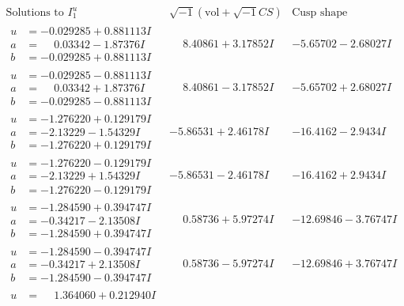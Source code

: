 \documentclass[1p]{elsarticle_modified}
\theoremstyle{definition}
\newcommand{\I}{\sqrt{-1}}
\begin{document}
$$\begin{array}{c|c|c}  
\text{Solutions to }I^u_{1}& \I (\text{vol} + \sqrt{-1}CS) & \text{Cusp shape}\\
 \hline 
\begin{aligned}
u &= -0.029285 + 0.881113 I \\
a &= \phantom{-}0.03342 - 1.87376 I \\
b &= -0.029285 + 0.881113 I\end{aligned}
 & \phantom{-}8.40861 + 3.17852 I & -5.65702 - 2.68027 I \\ \hline\begin{aligned}
u &= -0.029285 - 0.881113 I \\
a &= \phantom{-}0.03342 + 1.87376 I \\
b &= -0.029285 - 0.881113 I\end{aligned}
 & \phantom{-}8.40861 - 3.17852 I & -5.65702 + 2.68027 I \\ \hline\begin{aligned}
u &= -1.276220 + 0.129179 I \\
a &= -2.13229 - 1.54329 I \\
b &= -1.276220 + 0.129179 I\end{aligned}
 & -5.86531 + 2.46178 I & -16.4162 - 2.9434 I \\ \hline\begin{aligned}
u &= -1.276220 - 0.129179 I \\
a &= -2.13229 + 1.54329 I \\
b &= -1.276220 - 0.129179 I\end{aligned}
 & -5.86531 - 2.46178 I & -16.4162 + 2.9434 I \\ \hline\begin{aligned}
u &= -1.284590 + 0.394747 I \\
a &= -0.34217 - 2.13508 I \\
b &= -1.284590 + 0.394747 I\end{aligned}
 & \phantom{-}0.58736 + 5.97274 I & -12.69846 - 3.76747 I \\ \hline\begin{aligned}
u &= -1.284590 - 0.394747 I \\
a &= -0.34217 + 2.13508 I \\
b &= -1.284590 - 0.394747 I\end{aligned}
 & \phantom{-}0.58736 - 5.97274 I & -12.69846 + 3.76747 I \\ \hline\begin{aligned}
u &= \phantom{-}1.364060 + 0.212940 I \\

\end{aligned}
\end{array}$$
\end{document}
